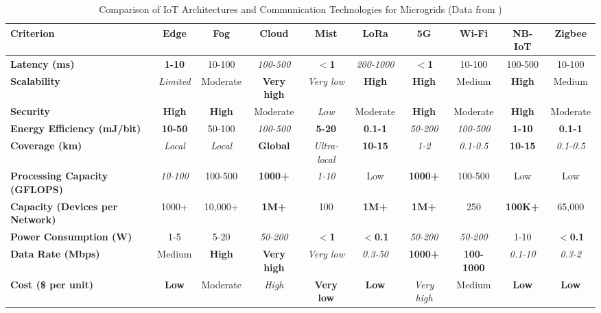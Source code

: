 \documentclass[conference]{IEEEtran}
\begin{document}
\begin{table*}[t]
\centering
\caption{Comparison of IoT Architectures and Communication Technologies for Microgrids (Data from \cite{systematicsurvey, TagoIO2023, s24082509})}
\label{tab:comparison}
\begin{tabular}{|l|c|c|c|c|c|c|c|c|c|}
\hline
\textbf{Criterion} & \textbf{Edge} & \textbf{Fog} & \textbf{Cloud} & \textbf{Mist} & \textbf{LoRa} & \textbf{5G} & \textbf{Wi-Fi} & \textbf{NB-IoT} & \textbf{Zigbee} \\
\hline
\textbf{Latency (ms)} & \textbf{1-10} & 10-100 & \textit{100-500} & \textbf{$<$1} & \textit{200-1000} & \textbf{$<$1} & 10-100 & 100-500 & 10-100 \\
\hline
\textbf{Scalability} & \textit{Limited} & Moderate & \textbf{Very high} & \textit{Very low} & \textbf{High} & \textbf{High} & Medium & \textbf{High} & Medium \\
\hline
\textbf{Security} & \textbf{High} & \textbf{High} & Moderate & \textit{Low} & Moderate & \textbf{High} & Moderate & \textbf{High} & Moderate \\
\hline
\textbf{Energy Efficiency (mJ/bit)} & \textbf{10-50} & 50-100 & \textit{100-500} & \textbf{5-20} & \textbf{0.1-1} & \textit{50-200} & \textit{100-500} & \textbf{1-10} & \textbf{0.1-1} \\
\hline
\textbf{Coverage (km)} & \textit{Local} & \textit{Local} & \textbf{Global} & \textit{Ultra-local} & \textbf{10-15} & \textit{1-2} & \textit{0.1-0.5} & \textbf{10-15} & \textit{0.1-0.5} \\
\hline
\textbf{Processing Capacity (GFLOPS)} & \textit{10-100} & 100-500 & \textbf{1000+} & \textit{1-10} & Low & \textbf{1000+} & 100-500 & Low & Low \\
\hline
\textbf{Capacity (Devices per Network)} & 1000+ & 10,000+ & \textbf{1M+} & 100 & \textbf{1M+} & \textbf{1M+} & 250 & \textbf{100K+} & 65,000 \\
\hline
\textbf{Power Consumption (W)} & 1-5 & 5-20 & \textit{50-200} & \textbf{$<$1} & \textbf{$<$0.1} & \textit{50-200} & \textit{50-200} & 1-10 & \textbf{$<$0.1} \\
\hline
\textbf{Data Rate (Mbps)} & Medium & \textbf{High} & \textbf{Very high} & \textit{Very low} & \textit{0.3-50} & \textbf{1000+} & \textbf{100-1000} & \textit{0.1-10} & \textit{0.3-2} \\
\hline
\textbf{Cost (\$ per unit)} & \textbf{Low} & Moderate & \textit{High} & \textbf{Very low} & \textbf{Low} & \textit{Very high} & Medium & \textbf{Low} & \textbf{Low} \\
\hline
\end{tabular}
\end{table*}
\end{document}
